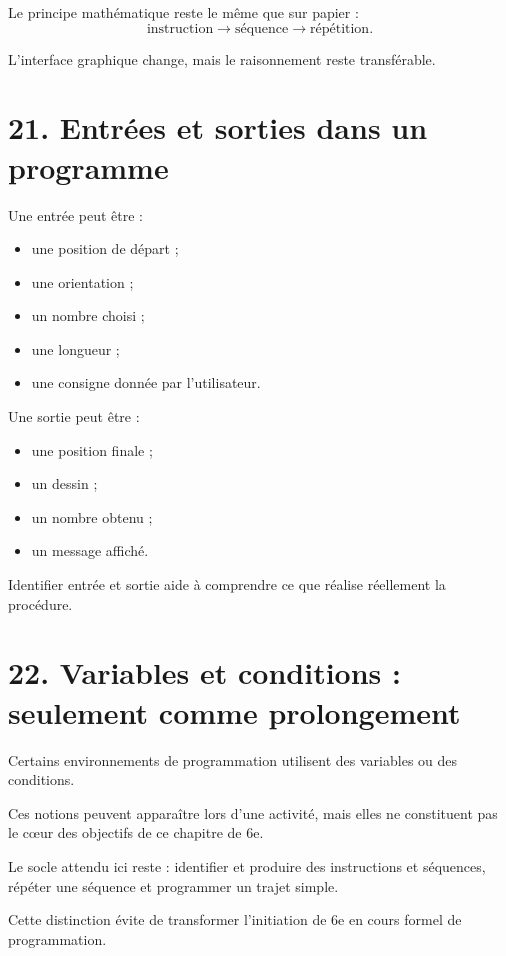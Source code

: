 Le principe mathématique reste le même que sur papier :
\[
\text{instruction}
\longrightarrow
\text{séquence}
\longrightarrow
\text{répétition}.
\]

L'interface graphique change, mais le raisonnement reste transférable.

\section{21. Entrées et sorties dans un programme}

Une entrée peut être :
\begin{itemize}
\item une position de départ ;
\item une orientation ;
\item un nombre choisi ;
\item une longueur ;
\item une consigne donnée par l'utilisateur.
\end{itemize}

Une sortie peut être :
\begin{itemize}
\item une position finale ;
\item un dessin ;
\item un nombre obtenu ;
\item un message affiché.
\end{itemize}

Identifier entrée et sortie aide à comprendre ce que réalise réellement la procédure.

\section{22. Variables et conditions : seulement comme prolongement}

Certains environnements de programmation utilisent des variables ou des conditions.

Ces notions peuvent apparaître lors d'une activité, mais elles ne constituent pas le cœur des objectifs de ce chapitre de 6e.

\begin{remarque}
Le socle attendu ici reste : identifier et produire des instructions et séquences, répéter une séquence et programmer un trajet simple.
\end{remarque}

Cette distinction évite de transformer l'initiation de 6e en cours formel de programmation.

